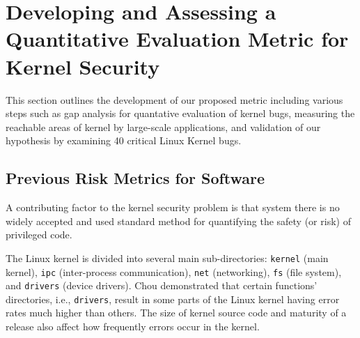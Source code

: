 	\section{Developing and Assessing a Quantitative Evaluation Metric for
Kernel Security}
\label{sec.metric}




This section outlines the development of our proposed metric including various steps such as gap analysis for quantative evaluation of kernel bugs, measuring the reachable areas of kernel by large-scale applications, and validation of our hypothesis by examining 40 critical Linux Kernel bugs.


\subsection{Previous Risk Metrics for Software}

A contributing factor to the kernel security problem is that system there is
no widely accepted and used standard method for quantifying the safety (or risk) of
privileged code.  



The Linux kernel is divided into several main sub-directories:
\texttt{kernel} (main kernel), \texttt{ipc} (inter-process communication),
\texttt{net} (networking), \texttt{fs} (file system), and \texttt{drivers} (device drivers).
Chou %
\cite{PittSFIeld} demonstrated that certain functions' directories, i.e.,
\texttt{drivers}, result in some parts of the Linux kernel having
error rates much higher than others. The size of kernel source code and maturity of a release also affect how frequently errors occur in the kernel.

